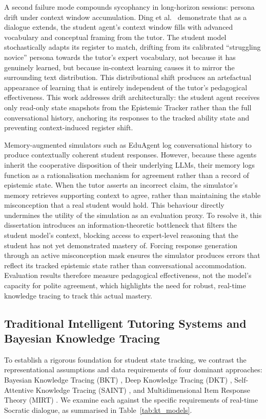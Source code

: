 \documentclass[11pt,a4paper]{report}
\begin{document}
A second failure mode compounds sycophancy in long-horizon sessions: persona drift under context window accumulation. Ding et al.\ \cite{ding2026contextecho} demonstrate that as a dialogue extends, the student agent's context window fills with advanced vocabulary and conceptual framing from the tutor. The student model stochastically adapts its register to match, drifting from its calibrated ``struggling novice'' persona towards the tutor's expert vocabulary, not because it has genuinely learned, but because in-context learning causes it to mirror the surrounding text distribution. This distributional shift produces an artefactual appearance of learning that is entirely independent of the tutor's pedagogical effectiveness. This work addresses drift architecturally: the student agent receives only read-only state snapshots from the Epistemic Tracker rather than the full conversational history, anchoring its responses to the tracked ability state and preventing context-induced register shift.

Memory-augmented simulators such as EduAgent \cite{xu2024eduagent} log conversational history to produce contextually coherent student responses. However, because these agents inherit the cooperative disposition of their underlying LLMs, their memory logs function as a rationalisation mechanism for agreement rather than a record of epistemic state. When the tutor asserts an incorrect claim, the simulator's memory retrieves supporting context to agree, rather than maintaining the stable misconception that a real student would hold. This behaviour directly undermines the utility of the simulation as an evaluation proxy. To resolve it, this dissertation introduces an information-theoretic bottleneck that filters the student model's context, blocking access to expert-level reasoning that the student has not yet demonstrated mastery of. Forcing response generation through an active misconception mask ensures the simulator produces errors that reflect its tracked epistemic state rather than conversational accommodation. Evaluation results therefore measure pedagogical effectiveness, not the model's capacity for polite agreement, which highlights the need for robust, real-time knowledge tracing to track this actual mastery.

\subsection{Traditional Intelligent Tutoring Systems and Bayesian Knowledge Tracing}
To establish a rigorous foundation for student state tracking, we contrast the representational assumptions and data requirements of four dominant approaches: Bayesian Knowledge Tracing (BKT) \cite{corbett1994knowledge}, Deep Knowledge Tracing (DKT) \cite{piech2015deep}, Self-Attentive Knowledge Tracing (SAINT) \cite{choi2020saint}, and Multidimensional Item Response Theory (MIRT) \cite{reckase2009multidimensional}. We examine each against the specific requirements of real-time Socratic dialogue, as summarised in Table~\ref{tab:kt_models}.
\end{document}
